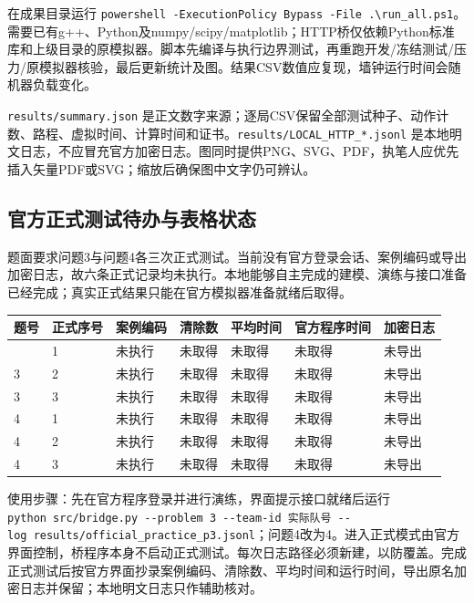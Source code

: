 \documentclass[
  chinese,
  UTF8,
  a4paper,
  zihao=-4]{ctexart}
\begin{document}
在成果目录运行
\texttt{powershell\ -ExecutionPolicy\ Bypass\ -File\ .\textbackslash{}run\_all.ps1}。需要已有g++、Python及numpy/scipy/matplotlib；HTTP桥仅依赖Python标准库和上级目录的原模拟器。脚本先编译与执行边界测试，再重跑开发/冻结测试/压力/原模拟器核验，最后更新统计及图。结果CSV数值应复现，墙钟运行时间会随机器负载变化。

\texttt{results/summary.json}
是正文数字来源；逐局CSV保留全部测试种子、动作计数、路程、虚拟时间、计算时间和证书。\texttt{results/LOCAL\_HTTP\_*.jsonl}
是本地明文日志，不应冒充官方加密日志。图同时提供PNG、SVG、PDF，执笔人应优先插入矢量PDF或SVG；缩放后确保图中文字仍可辨认。

\subsection{官方正式测试待办与表格状态}\label{ux5b98ux65b9ux6b63ux5f0fux6d4bux8bd5ux5f85ux529eux4e0eux8868ux683cux72b6ux6001}

题面要求问题3与问题4各三次正式测试。当前没有官方登录会话、案例编码或导出加密日志，故六条正式记录均未执行。本地能够自主完成的建模、演练与接口准备已经完成；真实正式结果只能在官方模拟器准备就绪后取得。

\begin{longtable}[]{@{}lllllll@{}}
\toprule\noalign{}
题号 & 正式序号 & 案例编码 & 清除数 & 平均时间 & 官方程序时间 &
加密日志 \\
\midrule\noalign{}
\endhead
\bottomrule\noalign{}
\endlastfoot
3 & 1 & 未执行 & 未取得 & 未取得 & 未取得 & 未导出 \\
3 & 2 & 未执行 & 未取得 & 未取得 & 未取得 & 未导出 \\
3 & 3 & 未执行 & 未取得 & 未取得 & 未取得 & 未导出 \\
4 & 1 & 未执行 & 未取得 & 未取得 & 未取得 & 未导出 \\
4 & 2 & 未执行 & 未取得 & 未取得 & 未取得 & 未导出 \\
4 & 3 & 未执行 & 未取得 & 未取得 & 未取得 & 未导出 \\
\end{longtable}

使用步骤：先在官方程序登录并进行演练，界面提示接口就绪后运行
\texttt{python\ src/bridge.py\ -\/-problem\ 3\ -\/-team-id\ 实际队号\ -\/-log\ results/official\_practice\_p3.jsonl}；问题4改为4。进入正式模式由官方界面控制，桥程序本身不启动正式测试。每次日志路径必须新建，以防覆盖。完成正式测试后按官方界面抄录案例编码、清除数、平均时间和运行时间，导出原名加密日志并保留；本地明文日志只作辅助核对。
\end{document}
